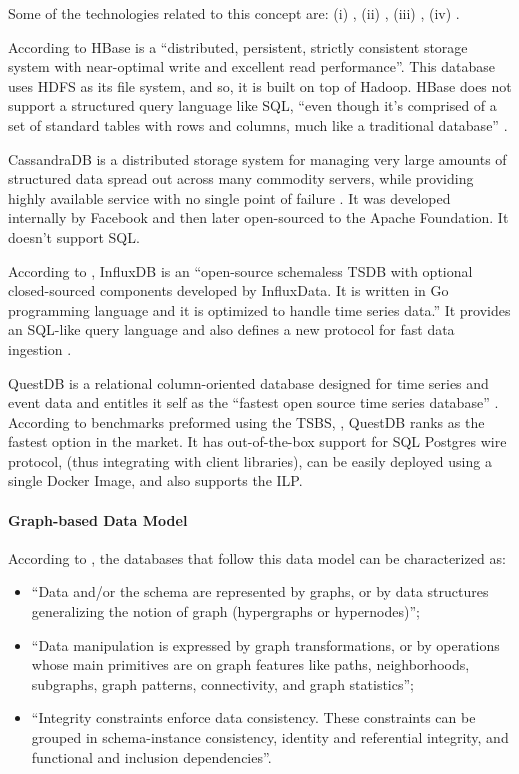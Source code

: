 Some of the technologies related to this concept are: (i) , (ii) , (iii) , (iv) .

According to \cite{george2011hbase} HBase is a ``distributed, persistent, strictly consistent storage system with near-optimal write and excellent read performance''. This database uses \gls{HDFS} as its file system, and so, it is built on top of Hadoop.
HBase does not support a structured query language like \gls{SQL}, ``even though it's comprised of a set of standard tables with rows and columns, much like a traditional database'' \parencite{ibm-hbase}.

CassandraDB is a distributed storage system for managing very large amounts of structured data spread out across many commodity servers, while providing highly available service with no single point of failure \parencite{lakshman2010cassandra}.
It was developed internally by Facebook and then later open-sourced to the Apache Foundation. It doesn't support \gls{SQL}.

According to \cite{naqvi2017time}, InfluxDB is an ``open-source schemaless \gls{TSDB} with optional closed-sourced components developed by InfluxData. It is written in Go programming language and it is optimized to handle time series data.'' It provides an SQL-like query language and also defines a new protocol for fast data ingestion \parencite{ilp}.

QuestDB is a relational column-oriented database designed for time series and event data and entitles it self as the ``fastest open source time series database'' \parencite{questdb}.
According to benchmarks \parencite{quest-bench} preformed using the \gls{TSBS}, \cite{TSBS}, QuestDB ranks as the fastest option in the market.
It has out-of-the-box support for SQL Postgres wire protocol, (thus integrating with  client libraries), can be easily deployed using a single Docker Image, and also supports the \gls{ILP}.

\paragraph{Graph-based Data Model}
\label{par:stateofart:arch:infra:store:graph}

According to \cite{angles2008survey}, the databases that follow this data model can be characterized as:

\begin{itemize}
    \item ``Data and/or the schema are represented by graphs, or by data structures generalizing the notion of graph (hypergraphs or hypernodes)'';
    \item ``Data manipulation is expressed by graph transformations, or by operations whose main primitives are on graph features like paths, neighborhoods, subgraphs, graph patterns, connectivity, and graph statistics'';
    \item ``Integrity constraints enforce data consistency. These constraints can be grouped in schema-instance consistency, identity and referential integrity, and functional and inclusion dependencies''.
\end{itemize}

